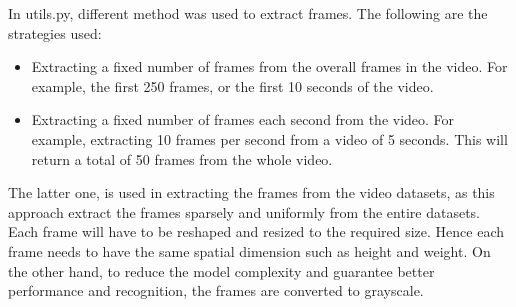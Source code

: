 In utils.py, different method was used to extract frames. The following are the strategies used:
\begin{itemize}
\item Extracting a fixed number of frames from the overall frames in the video. For example, the first 250 frames, or the first 10 seconds of the video.
\item Extracting a fixed number of frames each second from the video. For example, extracting 10 frames per second from a video of 5 seconds. This will return a total of 50 frames from the whole video.
\end{itemize}
\hspace{5mm} The latter one, is used in extracting the frames from the video datasets, as this approach extract the frames sparsely and uniformly from the entire datasets.
Each frame will have to be reshaped and resized to the required size. Hence each frame needs to have the same spatial dimension such as height and weight. On the other hand, to reduce the model complexity and guarantee better performance and recognition, the frames are converted to grayscale.\\

